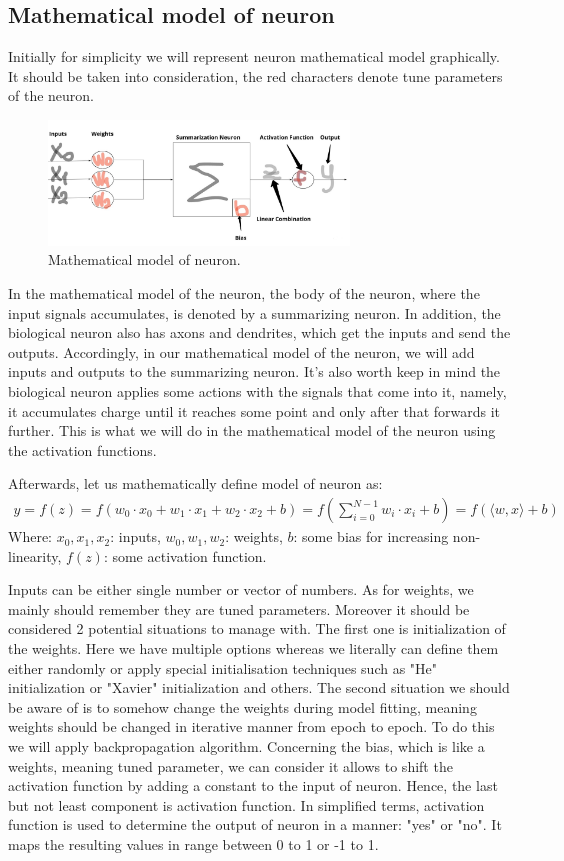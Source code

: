 \documentclass{article}
\begin{document}
\subsection{Mathematical model of neuron}
Initially for simplicity we will represent neuron mathematical model graphically. It should be taken into consideration, the red characters denote tune parameters of the neuron.     
\begin{figure}[h]
    \centering \includegraphics[width=8cm]{images/neuron_math_model.jpg}
    \caption {Mathematical model of neuron.}
\end{figure} 

In the mathematical model of the neuron, the body of the neuron, where the input signals accumulates, is denoted by a summarizing neuron. In addition, the biological neuron also has axons and dendrites, which get the inputs and send the outputs. Accordingly, in our mathematical model of the neuron, we will add inputs and outputs to the summarizing neuron. It's also worth keep in mind the biological neuron applies some actions with the signals that come into it, namely, it accumulates charge until it reaches some point and only after that forwards it further. This is what we will do in the mathematical model of the neuron using the activation functions.

Afterwards, let us mathematically define model of neuron as:
\begin{align*}
y = f(z) = f(w_0 \cdot x_0+w_1 \cdot x_1+w_2 \cdot x_2+b) = f(\sum\limits_{i=0}^{N-1} w_i \cdot x_i+b) = f(\langle w, x \rangle + b)
\end{align*}
Where: $x_0, x_1, x_2$: inputs, $w_0, w_1, w_2$: weights,  $b$: some bias for increasing non-linearity, $f(z)$: some activation function. 

Inputs can be either single number or vector of numbers. As for weights, we mainly should remember they are tuned parameters. Moreover it should be considered 2 potential situations to manage with. The first one is initialization of the weights. Here we have multiple options whereas we literally can define them either randomly or apply special initialisation techniques such as "He" initialization or "Xavier" initialization and others. The second situation we should be aware of is to somehow change the weights during model fitting, meaning weights should be changed in iterative manner from epoch to epoch. To do this we will apply backpropagation algorithm. Concerning the bias, which is like a weights, meaning tuned parameter, we can consider it allows to shift the activation function by adding a constant to the input of neuron. Hence, the last but not least component is activation function. In simplified terms, activation function is used to determine the output of neuron in a manner: "yes" or "no". It maps the resulting values in range between 0 to 1 or -1 to 1.            
\end{document}
